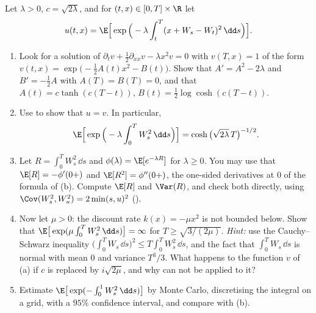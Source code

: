 \begin{exercise}\label{ex:fk-quadratic}
\medium Let $\lambda>0$, $c=\sqrt{2\lambda}$, and for $(t,x)\in[0,T]\times\R$ let
\[
  u(t,x)=\E\Big[\exp\Big(-\lambda\int_t^T(x+W_s-W_t)^2\,\dd s\Big)\Big].
\]
\begin{enumerate}[label=(\alph*)]
  \item Look for a solution of $\partial_tv+\frac12\partial_{xx}v-\lambda x^2v=0$ with $v(T,x)=1$ of
    the form $v(t,x)=\exp\big(-\frac12A(t)x^2-B(t)\big)$. Show that $A'=A^2-2\lambda$ and $B'=-\frac12A$
    with $A(T)=B(T)=0$, and that $A(t)=c\tanh(c(T-t))$, $B(t)=\frac12\log\cosh(c(T-t))$.
  \item Use  to show that $u=v$. In particular,
    \[
      \E\Big[\exp\Big(-\lambda\int_0^TW_s^2\,\dd s\Big)\Big]=\cosh\big(\sqrt{2\lambda}\,T\big)^{-1/2}.
    \]
  \item Let $R=\int_0^TW_s^2\,\dd s$ and $\phi(\lambda)=\E[e^{-\lambda R}]$ for $\lambda\ge0$. You may
    use that $\E[R]=-\phi'(0+)$ and $\E[R^2]=\phi''(0+)$, the one-sided derivatives at $0$ of the
    formula of (b). Compute $\E[R]$ and $\Var(R)$, and check both directly, using
    $\Cov(W_s^2,W_u^2)=2\min(s,u)^2$ ().
  \item Now let $\mu>0$: the discount rate $k(x)=-\mu x^2$ is not bounded below. Show that
    $\E\big[\exp(\mu\int_0^TW_s^2\,\dd s)\big]=\infty$ for $T\ge\sqrt{3/(2\mu)}$. \emph{Hint:} use the
    Cauchy--Schwarz inequality $\big(\int_0^TW_s\,\dd s\big)^2\le T\int_0^TW_s^2\,\dd s$, and the fact that
    $\int_0^TW_s\,\dd s$ is normal with mean $0$ and variance $T^3/3$. What happens to the function
    $v$ of (a) if $c$ is replaced by $i\sqrt{2\mu}$, and why can  not be
    applied to it?
  \item Estimate $\E\big[\exp(-\int_0^1W_s^2\,\dd s)\big]$ by Monte Carlo, discretising the integral on
    a grid, with a $95\%$ confidence interval, and compare with (b).
\end{enumerate}
\end{exercise}

